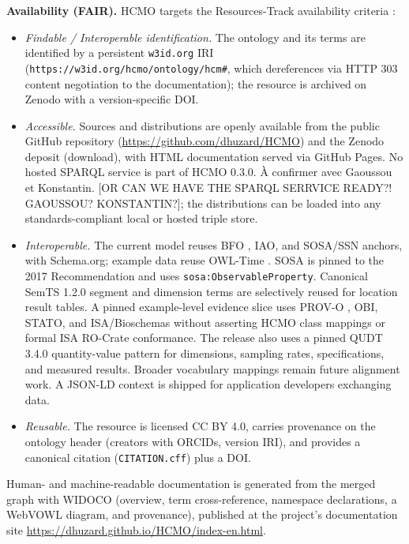 \textbf{Availability (FAIR).} HCMO targets the Resources-Track availability criteria \cite{fair}:

\begin{itemize}
\item \emph{Findable / Interoperable identification.} The ontology and its terms are
identified by a persistent \nolinkurl{w3id.org} IRI (\nolinkurl{https://w3id.org/hcmo/ontology/hcm#}, which dereferences via HTTP 303 content negotiation to the documentation); the resource is archived on Zenodo with a version-specific DOI.

\item \emph{Accessible.} Sources and distributions are openly available from the
public GitHub repository (\url{https://github.com/dhuzard/HCMO}) and the Zenodo
deposit (download), with HTML documentation served via GitHub Pages. \reviewcomment
  {No hosted SPARQL service is part of HCMO 0.3.0.}
  {À confirmer avec Gaoussou et Konstantin.} [OR CAN WE HAVE THE SPARQL SERRVICE READY?! GAOUSSOU? KONSTANTIN?]; the distributions can be loaded into any standards-compliant local or hosted triple store.

\item \emph{Interoperable.} The current model reuses BFO \cite{bfo}, IAO, and SOSA/SSN
\cite{sosa} anchors, with Schema.org; example data reuse OWL-Time \cite{owltime}. SOSA is pinned to the 2017 Recommendation and uses \nolinkurl{sosa:ObservableProperty}. Canonical SemTS 1.2.0 segment and dimension terms are selectively reused for location result tables. A pinned example-level evidence slice uses PROV-O \cite{provo}, OBI, STATO, and ISA/Bioschemas without asserting HCMO class mappings or formal ISA RO-Crate conformance. The release also uses a pinned QUDT 3.4.0 quantity-value pattern for dimensions, sampling rates, specifications, and measured results. Broader vocabulary mappings remain future alignment work. A JSON-LD context is shipped for application developers exchanging data.

\item \emph{Reusable.} The resource is licensed CC BY 4.0, carries provenance on the
ontology header (creators with ORCIDs, version IRI), and provides a canonical citation (\nolinkurl{CITATION.cff}) plus a DOI.

\end{itemize}

Human- and machine-readable documentation is generated from the merged graph with WIDOCO \cite{widoco2017} (overview, term cross-reference, namespace declarations, a WebVOWL diagram, and provenance), published at the project's documentation site \url{https://dhuzard.github.io/HCMO/index-en.html}.

